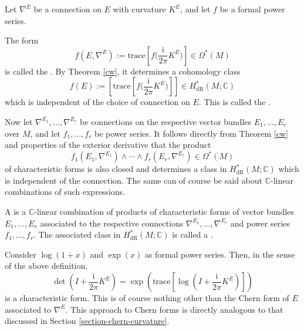 \documentclass[a4paper,openany]{scrbook}
\newcommand{\ui}{\mathrm{i}}
\begin{document}
Let $\nabla^E$ be a connection on $E$ with curvature $K^E$, and let $f$ be a formal power series.

\begin{definition}
The form
\begin{equation*}
f(E,\nabla^E):=\text{trace}\left[f\Big(\frac{\ui}{2\pi}K^E\Big)\right]\in\Omega^*(M)
\end{equation*}
is called the . By Theorem \ref{cw}, it determines a cohomology class 
\begin{equation*}
f(E):=\left[\text{trace}\left[f\Big(\frac{\ui}{2\pi}K^E\Big)\right]\right]\in H_\text{dR}^*(M;\mathbb{C})
\end{equation*}
which is independent of the choice of connection on $E$. This is called the . 
\end{definition}

Now let $\nabla^{E_1},\dots,\nabla^{E_r}$ be connections on the respective vector bundles $E_1,\dots,E_r$ over $M$, and let $f_1,\dots,f_r$ be power series. It follows directly from Theorem \ref{cw} and properties of the exterior derivative that the product
\begin{equation*}
f_1(E_1,\nabla^{E_1})\wedge\cdots\wedge f_r(E_r,\nabla^{E_r})\in\Omega^*(M)
\end{equation*}
of characteristic forms is also closed and determines a class in $H_\text{dR}^*(M;\mathbb{C})$ which is independent of the connection. The same can of course be said about $\mathbb{C}$-linear combinations of such expressions.

\begin{definition}
A  is a $\mathbb{C}$-linear combination of products of characteristic forms of vector bundles $E_1,\dots,E_r$ associated to the respective connections $\nabla^{E_1},\dots,\nabla^{E_r}$ and power series $f_1,\dots,f_r$. The associated class in $H_\text{dR}^*(M;\mathbb{C})$ is called a .
\end{definition}

\begin{example}
Consider $\log(1+x)$ and $\exp(x)$ as formal power series. Then, in the sense of the above definition,
\begin{equation}\label{cwchern0}
\det\left(I+\frac{\ui}{2\pi}K^E\right)=\exp\left(\text{trace}\left[\log\left(I+\frac{\ui}{2\pi}K^E\right)\right]\right)
\end{equation}
is a characteristic form. This is of course nothing other than the Chern form of $E$ associated to $\nabla^E$. This approach to Chern forms is directly analogous to that discussed in Section \ref{section-chern-curvature}.
\end{example}
\end{document}
